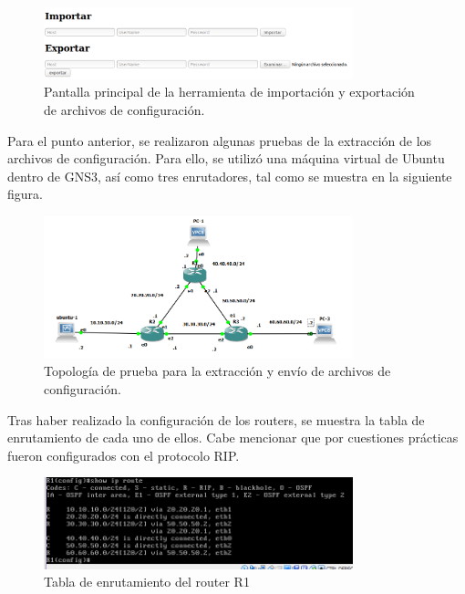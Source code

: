 \begin{figure}[htbp!]
	\centering
		\includegraphics[width=0.8\textwidth]{desarrollo/tarea3/imagenes/imagen2.png}
	\caption{Pantalla principal de la herramienta de importación y exportación de archivos de configuración.}
\end{figure}

Para el punto anterior, se realizaron algunas pruebas de la extracción de los archivos de configuración. Para ello, se utilizó una máquina virtual de Ubuntu dentro de GNS3, así como tres enrutadores, tal como se muestra en la siguiente figura.

\pagebreak
\begin{figure}[htbp!]
	\centering
		\includegraphics[width=0.8\textwidth]{desarrollo/tarea3/imagenes/imagen3.png}
	\caption{Topología de prueba para la extracción y envío de archivos de configuración.}
\end{figure}

Tras haber realizado la configuración de los routers, se muestra la tabla de enrutamiento de cada uno de ellos. Cabe mencionar que por cuestiones prácticas fueron configurados con el protocolo RIP.

\begin{figure}[htbp!]
	\centering
		\includegraphics[width=0.8\textwidth]{desarrollo/tarea3/imagenes/imagen4.png}
	\caption{Tabla de enrutamiento del router R1}
\end{figure}

